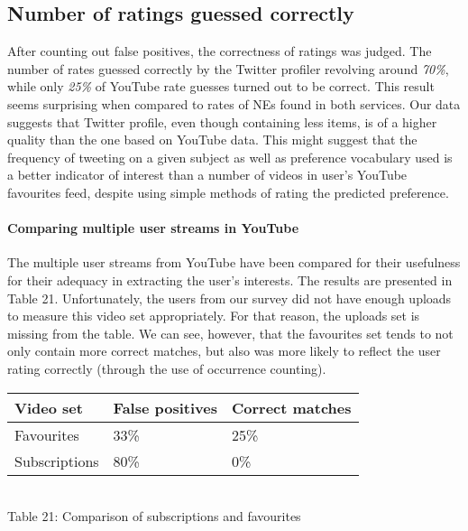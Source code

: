 \subsection{Number of ratings guessed correctly}
After counting out false positives, the correctness of ratings was judged. The
number of rates guessed correctly by the Twitter profiler revolving around \textit{70\%},
while only \textit{25\%} of YouTube rate guesses turned out to be correct. This
result seems surprising when compared to rates of NEs found in both
services. Our data suggests that Twitter profile, even though containing less
items, is of a higher quality than the one based on YouTube data.  This
might suggest that the frequency of tweeting on a given subject as well as
preference vocabulary used is a better indicator of interest than a number of
videos in user's YouTube favourites feed, despite using simple methods of rating
the predicted preference.

\paragraph{Comparing multiple user streams in YouTube}

The multiple user streams from YouTube have been compared for their usefulness
for their adequacy in extracting the user's interests. The results are presented
in Table 21. Unfortunately, the users from our survey did not have enough
uploads to measure this video set appropriately. For that reason, the uploads
set is missing from the table. We can see, however, that the favourites set
tends to not only contain more correct matches, but also was more likely to
reflect the user rating correctly (through the use of occurrence counting).

\begin{center}
  \begin{tabular}{| l | l | l |}
  Video set & False positives & Correct matches \\ \hline
  Favourites & 33\% & 25\% \\
  Subscriptions & 80\% & 0\% \\
  \end{tabular} \\
  Table 21: Comparison of subscriptions and favourites
\end{center}
